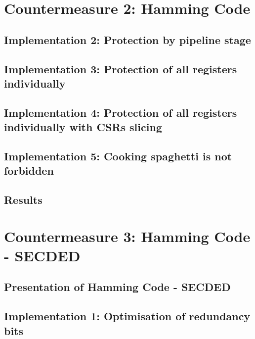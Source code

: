 
\section{Countermeasure 2: Hamming Code}
\label{section:chap6_hammingcode}

\subsection{Implementation 2: Protection by pipeline stage}

\subsection{Implementation 3: Protection of all registers individually}

\subsection{Implementation 4: Protection of all registers individually with CSRs slicing}

\subsection{Implementation 5: Cooking spaghetti is not forbidden}

\subsection{Results}

\section{Countermeasure 3: Hamming Code - SECDED}
\label{section:chap6_secded}

\subsection{Presentation of Hamming Code - SECDED}

\subsection{Implementation 1: Optimisation of redundancy bits}

